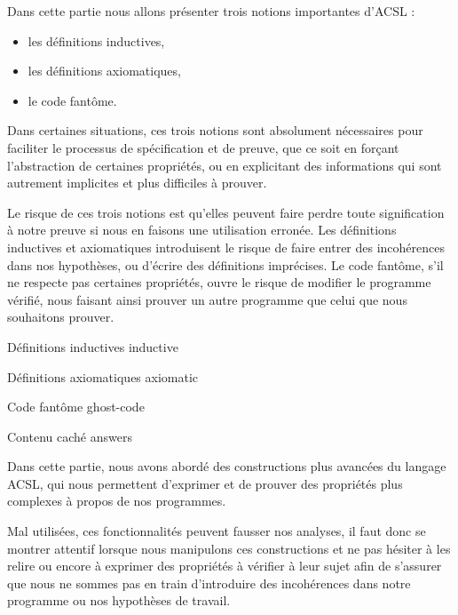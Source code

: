 Dans cette partie nous allons présenter trois notions importantes d'ACSL :
\begin{itemize}
\item les définitions inductives,
\item les définitions axiomatiques,
\item le code fantôme.
\end{itemize}


Dans certaines situations, ces trois notions sont absolument nécessaires
pour faciliter le processus de spécification et de preuve, que ce soit en forçant
l'abstraction de certaines propriétés, ou en explicitant des informations qui
sont autrement implicites et plus difficiles à prouver.



Le risque de ces trois notions est qu'elles peuvent faire perdre toute
signification à notre preuve si nous en faisons une utilisation erronée.
Les définitions inductives et
axiomatiques introduisent le risque de faire entrer des incohérences dans nos
hypothèses, ou d'écrire des définitions imprécises. Le code fantôme, s'il ne
respecte pas certaines propriétés, ouvre le risque de modifier le programme
vérifié, nous faisant ainsi prouver un autre programme que celui que nous
souhaitons prouver.


\begin{levelTwo}
  {Définitions inductives}
  {inductive}
\end{levelTwo}


\begin{levelTwo}
  {Définitions axiomatiques}
  {axiomatic}
\end{levelTwo}


\begin{levelTwo}
  {Code fantôme}
  {ghost-code}
\end{levelTwo}


\begin{levelTwo}
  {Contenu caché}
  {answers}
\end{levelTwo}


\horizontalLine
\newpage


Dans cette partie, nous avons abordé des constructions plus avancées du langage
ACSL, qui nous permettent d'exprimer et de prouver des propriétés plus complexes
à propos de nos programmes.



Mal utilisées, ces fonctionnalités peuvent fausser nos analyses, il faut donc se
montrer attentif lorsque nous manipulons ces constructions et ne pas hésiter à
les relire ou encore à exprimer des propriétés à vérifier à leur sujet afin de
s'assurer que nous ne sommes pas en train d'introduire des incohérences dans
notre programme ou nos hypothèses de travail.
